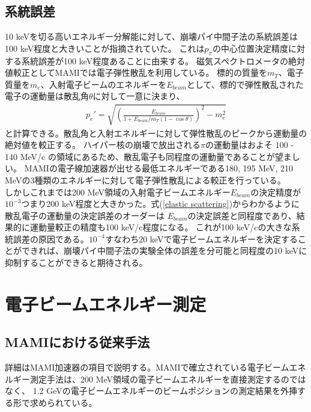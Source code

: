 \documentclass[a4paper,11pt,uplatex]{jsbook}
\begin{document}
\subsection{系統誤差}
10 keVを切る高いエネルギー分解能に対して、崩壊パイ中間子法の系統誤差は100 keV程度と大きいことが指摘されていた。
これは$p_\pi$の中心位置決定精度に対する系統誤差が100 keV程度あることに由来する。
磁気スペクトロメータの絶対値較正としてMAMIでは電子弾性散乱を利用している。
標的の質量を$m_T$、電子質量を$m_e$、入射電子ビームのエネルギーを$E_{beam}$として、標的で弾性散乱された電子の運動量は散乱角$\theta$に対して一意に決まり、
\begin{eqnarray}
  p_e' = \sqrt{\left(\frac{E_{beam}}{1 + E_{beam}/m_T(1 - \cos{\theta})} \right)^2 - m_e^2}\label{elastic scattering}
\end{eqnarray}
と計算できる。散乱角と入射エネルギーに対して弾性散乱のピークから運動量の絶対値を較正する。
ハイパー核の崩壊で放出される$\pi$の運動量はおよそ 100 - 140 MeV/c の領域にあるため、散乱電子も同程度の運動量であることが望ましい。
MAMIの電子線加速器が出せる最低エネルギーである180, 195 MeV, 210 MeVの3種類のエネルギーに対して電子弾性散乱による較正を行っている。\\
しかしこれまでは200 MeV領域の入射電子ビームエネルギー$E_{beam}$の決定精度が$10^{-3}$つまり200 keV程度と大きかった。式(\ref{elastic scattering})からわかるように散乱電子の運動量の決定誤差のオーダーは
$E_{beam}$の決定誤差と同程度であり、結果的に運動量較正の精度も100 keV/c程度になる。
これが100 keV/cの大きな系統誤差の原因である。$10^{-4}$すなわち$20$ keVで電子ビームエネルギーを決定することができれば、崩壊パイ中間子法の実験全体の誤差を分可能と同程度の10 keVに抑制することができると期待される。

\section{電子ビームエネルギー測定}
\subsection{MAMIにおける従来手法}
詳細はMAMI加速器の項目で説明する。MAMIで確立されている電子ビームエネルギー測定手法は、200 MeV領域の電子ビームエネルギーを直接測定するのではなく、
1.2 GeVの電子ビームエネルギーのビームポジションの測定結果を外挿する形で求められている。
\end{document}
